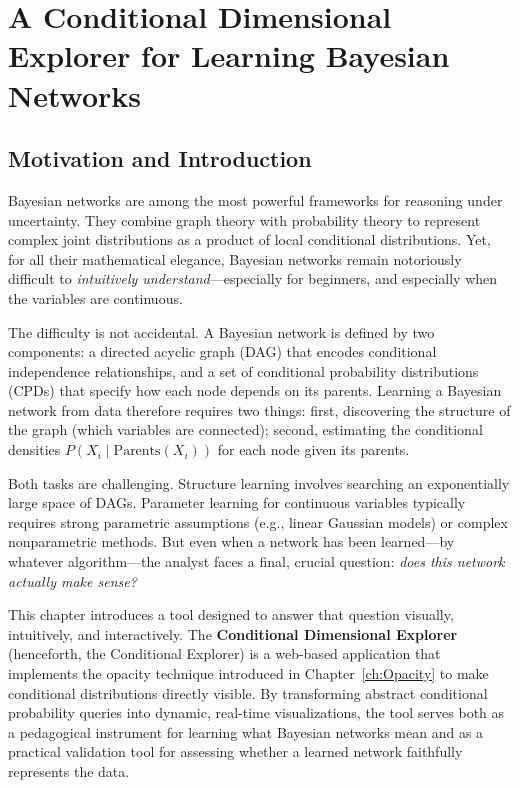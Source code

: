 \startcontents[chapter]
\chapter{A Conditional Dimensional Explorer for Learning Bayesian Networks}\label{ch:conditional_explorer}
\minitocboxed

\section{Motivation and Introduction}

Bayesian networks are among the most powerful frameworks for reasoning under uncertainty. They combine graph theory with probability theory to represent complex joint distributions as a product of local conditional distributions. Yet, for all their mathematical elegance, Bayesian networks remain notoriously difficult to \emph{intuitively understand}—especially for beginners, and especially when the variables are continuous.

The difficulty is not accidental. A Bayesian network is defined by two components: a directed acyclic graph (DAG) that encodes conditional independence relationships, and a set of conditional probability distributions (CPDs) that specify how each node depends on its parents. Learning a Bayesian network from data therefore requires two things: first, discovering the structure of the graph (which variables are connected); second, estimating the conditional densities \(P(X_i \mid \text{Parents}(X_i))\) for each node given its parents.

Both tasks are challenging. Structure learning involves searching an exponentially large space of DAGs. Parameter learning for continuous variables typically requires strong parametric assumptions (e.g., linear Gaussian models) or complex nonparametric methods. But even when a network has been learned—by whatever algorithm—the analyst faces a final, crucial question: \emph{does this network actually make sense?}

This chapter introduces a tool designed to answer that question visually, intuitively, and interactively. The \textbf{Conditional Dimensional Explorer} (henceforth, the Conditional Explorer) is a web-based application that implements the opacity technique introduced in Chapter~\ref{ch:Opacity} to make conditional distributions directly visible. By transforming abstract conditional probability queries into dynamic, real-time visualizations, the tool serves both as a pedagogical instrument for learning what Bayesian networks mean and as a practical validation tool for assessing whether a learned network faithfully represents the data.

